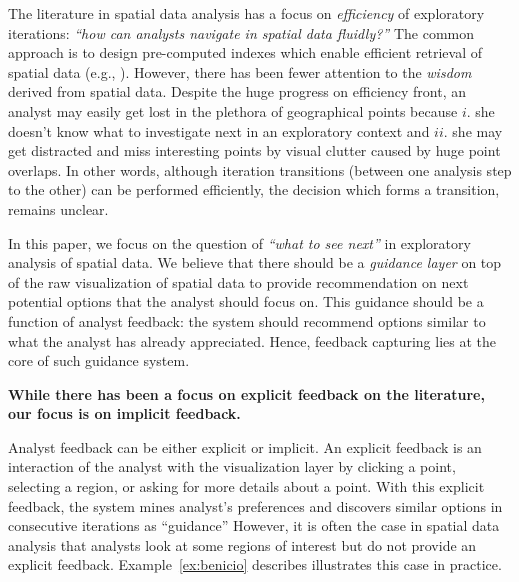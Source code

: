 \documentclass[runningheads,a4paper]{llncs}
\begin{document}
\vspace{3pt}
The literature in spatial data analysis has a focus on {\em efficiency} of exploratory iterations: {\em ``how can analysts navigate in spatial data fluidly?''} The common approach is to design pre-computed indexes which enable efficient retrieval of spatial data (e.g., \cite{lins2013nanocubes}). However, there has been fewer attention to the {\em wisdom} derived from spatial data. Despite the huge progress on efficiency front, an analyst may easily get lost in the plethora of geographical points because $i.$ she doesn't know what to investigate next in an exploratory context and $ii.$ she may get distracted and miss interesting points by visual clutter caused by huge point overlaps. In other words, although iteration transitions (between one analysis step to the other) can be performed efficiently, the decision which forms a transition, remains unclear.

\vspace{3pt}
In this paper, we focus on the question of {\em ``what to see next''} in exploratory analysis of spatial data.
We believe that there should be a {\em guidance layer} on top of the raw visualization of spatial data to provide recommendation on next potential options that the analyst should focus on. This guidance should be a function of analyst feedback: the system should recommend options similar to what the analyst has already appreciated. Hence, feedback capturing lies at the core of such guidance system.

\vspace{3pt}
{\bf While there has been a focus on explicit feedback on the literature, our focus is on implicit feedback.}

\vspace{3pt}
Analyst feedback can be either explicit or implicit. An explicit feedback is an interaction of the analyst with the visualization layer by clicking a point, selecting a region, or asking for more details about a point. With this explicit feedback, the system mines analyst's preferences and discovers similar options in consecutive iterations as ``guidance'' \cite{kamat2014distributed,Omidvar-Tehrani:2015,omidvar2017geoguide} However, it is often the case in spatial data analysis that analysts look at some regions of interest but do not provide an explicit feedback. Example~\ref{ex:benicio} describes illustrates this case in practice.
\end{document}
